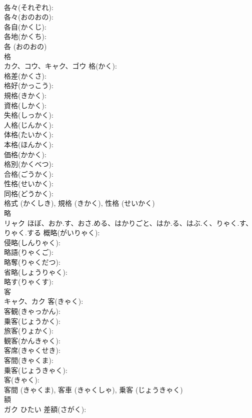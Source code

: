 \documentclass[8pt]{extreport}
\begin{document}
\begin{CJK}{UTF8}{min}
\\	各々(それぞれ): 
\\	各々(おのおの): 
\\	各自(かくじ): 
\\	各地(かくち): 
\\	各 (おのおの)
\\	格			
\\	カク、コウ、キャク、ゴウ		格(かく): 
\\	格差(かくさ): 
\\	格好(かっこう): 
\\	規格(きかく): 
\\	資格(しかく): 
\\	失格(しっかく): 
\\	人格(じんかく): 
\\	体格(たいかく): 
\\	本格(ほんかく): 
\\	価格(かかく): 
\\	格別(かくべつ): 
\\	合格(ごうかく): 
\\	性格(せいかく): 
\\	同格(どうかく): 
\\	格式 (かくしき), 規格 (きかく), 性格 (せいかく)
\\	略			
\\	リャク	ほぼ、おか.す、おさ.める、はかりごと、はか.る、はぶ.く、りゃく.す、りゃく.する	概略(がいりゃく): 
\\	侵略(しんりゃく): 
\\	略語(りゃくご): 
\\	略奪(りゃくだつ): 
\\	省略(しょうりゃく): 
\\	略す(りゃくす): 
\\	客			
\\	キャク、カク		客(きゃく): 
\\	客観(きゃっかん): 
\\	乗客(じょうかく): 
\\	旅客(りょかく): 
\\	観客(かんきゃく): 
\\	客席(きゃくせき): 
\\	客間(きゃくま): 
\\	乗客(じょうきゃく): 
\\	客(きゃく): 
\\	客間 (きゃくま), 客車 (きゃくしゃ), 乗客 (じょうきゃく)
\\	額			
\\	ガク	ひたい	差額(さがく): 

\end{CJK}
\end{document}
